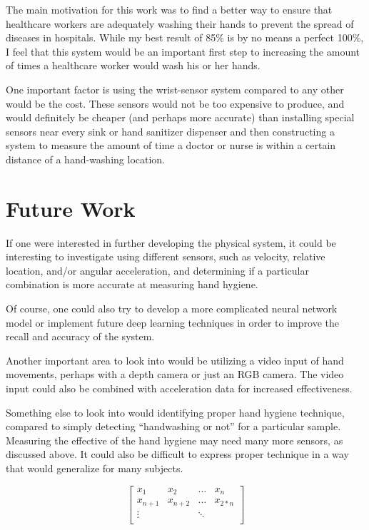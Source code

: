 \documentclass[]{report}
\begin{document}
The main motivation for this work was to find a better way to ensure that healthcare workers are adequately washing their hands to prevent the spread of diseases in hospitals. While my best result of 85\% is by no means a perfect 100\%, I feel that this system would be an important first step to increasing the amount of times a healthcare worker would wash his or her hands.

One important factor is using the wrist-sensor system compared to any other would be the cost. These sensors would not be too expensive to produce, and would definitely be cheaper (and perhaps more accurate) than installing special sensors near every sink or hand sanitizer dispenser and then constructing a system to measure the amount of time a doctor or nurse is within a certain distance of a hand-washing location.

\section{Future Work}

If one were interested in further developing the physical system, it could be interesting to investigate using different sensors, such as velocity, relative location, and/or angular acceleration, and determining if a particular combination is more accurate at measuring hand hygiene.

Of course, one could also try to develop a more complicated neural network model or implement future deep learning techniques in order to improve the recall and accuracy of the system.

Another important area to look into would be utilizing a video input of hand movements, perhaps with a depth camera or just an RGB camera. The video input could also be combined with acceleration data for increased effectiveness.

Something else to look into would identifying proper hand hygiene technique, compared to simply detecting ``handwashing or not'' for a particular sample. Measuring the effective of the hand hygiene may need many more sensors, as discussed above. It could also be difficult to express proper technique in a way that would generalize for many subjects.




$$
\left[
\begin{array}{cccc}
x_{1} & x_{2} & ... & x_{n} \\
x_{n+1} & x_{n+2} & ... & x_{2*n} \\
 \vdots & & \ddots & \\
\end{array}
\right]
$$






\end{document}
